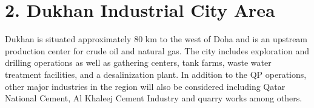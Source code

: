 \section{2.	Dukhan Industrial City Area}

Dukhan is situated approximately 80 km to the west of Doha and is an upstream production center for crude oil and natural gas. The city includes exploration and drilling operations as well as gathering centers, tank farms, waste water treatment facilities, and a desalinization plant.  In addition to the QP operations, other major industries in the region will also be considered including Qatar National Cement, Al Khaleej Cement Industry and quarry works among others. 
